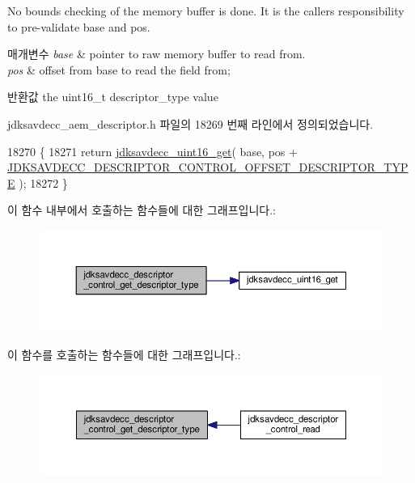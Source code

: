 No bounds checking of the memory buffer is done. It is the caller\textquotesingle{}s responsibility to pre-\/validate base and pos.


\begin{DoxyParams}{매개변수}
{\em base} & pointer to raw memory buffer to read from. \\
\hline
{\em pos} & offset from base to read the field from; \\
\hline
\end{DoxyParams}
\begin{DoxyReturn}{반환값}
the uint16\+\_\+t descriptor\+\_\+type value 
\end{DoxyReturn}


jdksavdecc\+\_\+aem\+\_\+descriptor.\+h 파일의 18269 번째 라인에서 정의되었습니다.


\begin{DoxyCode}
18270 \{
18271     \textcolor{keywordflow}{return} \hyperlink{group__endian_ga3fbbbc20be954aa61e039872965b0dc9}{jdksavdecc\_uint16\_get}( base, pos + 
      \hyperlink{group__descriptor__control_gab2638dd46f1c72775b22423487f7a878}{JDKSAVDECC\_DESCRIPTOR\_CONTROL\_OFFSET\_DESCRIPTOR\_TYPE} );
18272 \}
\end{DoxyCode}


이 함수 내부에서 호출하는 함수들에 대한 그래프입니다.\+:
\nopagebreak
\begin{figure}[H]
\begin{center}
\leavevmode
\includegraphics[width=350pt]{group__descriptor__control_ga747cdb72ec5e1e41fd494f2f31d82c87_cgraph}
\end{center}
\end{figure}




이 함수를 호출하는 함수들에 대한 그래프입니다.\+:
\nopagebreak
\begin{figure}[H]
\begin{center}
\leavevmode
\includegraphics[width=350pt]{group__descriptor__control_ga747cdb72ec5e1e41fd494f2f31d82c87_icgraph}
\end{center}
\end{figure}


